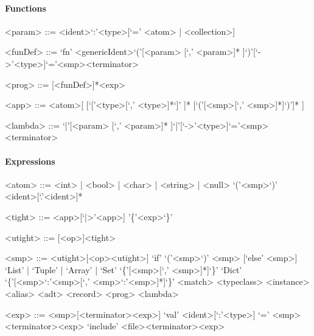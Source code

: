 \documentclass[11pt]{article} %
\begin{document}
\paragraph{Functions}

\begin{grammar}

<param> ::= <ident>`:'<type>[`=' <atom> | <collection>]

<funDef> ::= `fn' <genericIdent>`('[<param> [`,' <param>]* ]`)'[`->'<type>]`='<smp><terminator>

<prog> ::= [<funDef>]*<exp>

<app> ::= <atom>[ [`['<type>[`,' <type>]*`]' ]* [`('[<smp>[`,' <smp>]*]`)']* ]

<lambda> ::= `|'[<param> [`,' <param>]* ]`|'[`->'<type>]`='<smp><terminator>

\end{grammar}

\paragraph{Expressions}

\begin{grammar}

<atom> ::= <int> | <bool> | <char> | <string> | <null>
\alt `('<smp>`)'
\alt <ident>[`.'<ident>]*

<tight> ::= <app>[`|>'<app>]
\alt '\{'<exp>`\}'

<utight> ::= [<op>]<tight>

<smp> ::= <utight>[<op><utight>]
\alt `if' `('<smp>`)' <smp> [`else' <smp>]
\alt `List' | `Tuple' | `Array' | `Set' `\{'[<smp>[`,' <smp>]*]`\}'
\alt `Dict' `\{'[<smp>`:'<smp>[`,' <smp>`:'<smp>]*]`\}'
\alt <match>
\alt <typeclass>
\alt <instance>
\alt <alias>
\alt <adt>
\alt <record>
\alt <prog>
\alt <lambda>

<exp> ::= <smp>[<terminator><exp>]
\alt [`lazy'] `val' <ident>[`:'<type>] `=' <smp><terminator><exp>
\alt `include' <file><terminator><exp>

\end{grammar}
\end{document}

